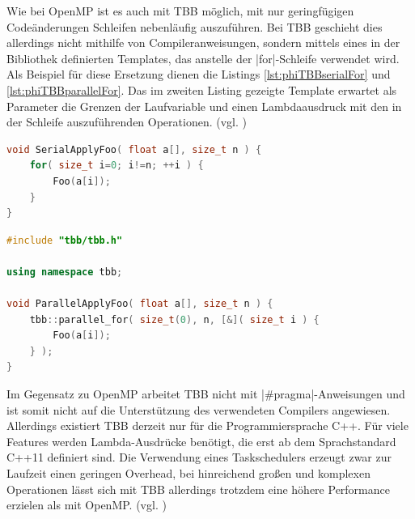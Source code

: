 \documentclass[../main.tex]{subfiles}
\begin{document}
Wie bei OpenMP ist es auch mit TBB möglich, mit nur geringfügigen Codeänderungen Schleifen nebenläufig auszuführen. Bei TBB geschieht dies allerdings nicht mithilfe von Compileranweisungen, sondern mittels eines in der Bibliothek definierten Templates, das anstelle der |for|-Schleife verwendet wird. Als Beispiel für diese Ersetzung dienen die Listings \ref{lst:phiTBBserialFor} und \ref{lst:phiTBBparallelFor}. Das im zweiten Listing gezeigte Template erwartet als Parameter die Grenzen der Laufvariable und einen Lambdaausdruck mit den in der Schleife auszuführenden Operationen. (vgl. \cite{intelTBBtutorial})
\begin{lstlisting}[language=c++, caption={Funktion mit serieller for-Schleife(Quelle: \parencite{intelTBBtutorial})}, captionpos=b, label=lst:phiTBBserialFor, frame=single, linewidth=\textwidth, breaklines=true]
void SerialApplyFoo( float a[], size_t n ) {
	for( size_t i=0; i!=n; ++i ) {
		Foo(a[i]);
	}
}
\end{lstlisting}
\begin{lstlisting}[language=c++, caption={Funktion mit parallel-for-Template(Quelle: \parencite{intelTBBtutorial})}, captionpos=b, label=lst:phiTBBparallelFor, frame=single, linewidth=\textwidth, breaklines=true]
#include "tbb/tbb.h"

using namespace tbb;

void ParallelApplyFoo( float a[], size_t n ) {
	tbb::parallel_for( size_t(0), n, [&]( size_t i ) {
		Foo(a[i]);
	} );
}
\end{lstlisting}
Im Gegensatz zu OpenMP arbeitet TBB nicht mit |#pragma|-Anweisungen und ist somit nicht auf die Unterstützung des verwendeten Compilers angewiesen. Allerdings existiert TBB derzeit nur für die Programmiersprache C++. Für viele Features werden Lambda-Ausdrücke benötigt, die erst ab dem Sprachstandard C++11 definiert sind. Die Verwendung eines Taskschedulers erzeugt zwar zur Laufzeit einen geringen Overhead, bei hinreichend großen und komplexen Operationen lässt sich mit TBB allerdings trotzdem eine höhere Performance erzielen als mit OpenMP. (vgl. \cite{xeonphiBestPractices})
\end{document}
